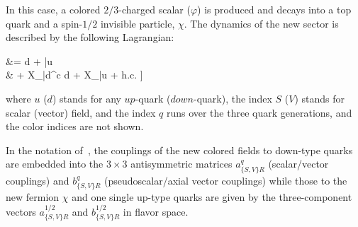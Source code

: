 \label{sec:ResonantProd}

In this case, a colored $2/3$-charged scalar ($\varphi$) is produced and decays into a top quark and a spin-$1/2$ invisible particle, $\chi$.  The dynamics of the new sector is described by the following Lagrangian:

\be\label{eq:lagrangianResonant}\bsp
\lag &=
\bigg[
\varphi \bar d^c
\Big[a^q_{SR} + b^q_{SR} \gamma_5 \Big] d +
\varphi \bar u  \chi
%
\\ &
+ X_\mu \bar d^c\gmu
{} d
%
+ X_\mu \bar u \gmu
{} \chi + 
{\rm h.c.} \bigg] 
\esp\ee


where $u$ ($d$) stands for any $up$-quark ($down$-quark), 
the index $S$ ($V$) stands for scalar (vector) field, and the index $q$ 
runs over the three quark generations, and the color indices are not shown. 


In the notation of~\cite{Agram:2013wda}, 
the couplings of the new colored fields to down-type quarks are
embedded into the $3\times 3$ antisymmetric matrices
$a^q_{\{S,V\}R}$ (scalar/vector couplings) and $b^q_{\{S,V\}R}$ (pseudoscalar/axial vector couplings)
while those to the new fermion $\chi$ and one
single up-type quarks are given by the three-component vectors
$a^{1/2}_{\{S,V\}R}$ and $b^{1/2}_{\{S,V\}R}$
in flavor space. 

